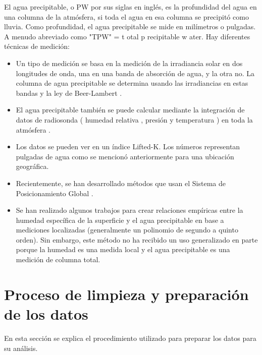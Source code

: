 \documentclass{article}
\begin{document}
El agua precipitable, o PW por sus siglas en inglés, es la profundidad del agua en una columna de la atmósfera, si toda el agua en esa columna se precipitó como lluvia. Como profundidad, el agua precipitable se mide en milímetros o pulgadas. A menudo abreviado como "TPW" = t otal p recipitable w ater. Hay diferentes técnicas de medición:
\begin{itemize}
\item Un tipo de medición se basa en la medición de la irradiancia solar en dos longitudes de onda, una en una banda de absorción de agua, y la otra no. La columna de agua precipitable se determina usando las irradiancias en estas bandas y la ley de Beer-Lambert .
\item El agua precipitable también se puede calcular mediante la integración de datos de radiosonda ( humedad relativa , presión y temperatura ) en toda la atmósfera .
\item Los datos se pueden ver en un índice Lifted-K. Los números representan pulgadas de agua como se mencionó anteriormente para una ubicación geográfica.
\item Recientemente, se han desarrollado métodos que usan el Sistema de Posicionamiento Global .
\item Se han realizado algunos trabajos para crear relaciones empíricas entre la humedad específica de la superficie y el agua precipitable en base a mediciones localizadas (generalmente un polinomio de segundo a quinto orden). Sin embargo, este método no ha recibido un uso generalizado en parte porque la humedad es una medida local y el agua precipitable es una medición de columna total.
\end{itemize}

\section{Proceso de limpieza y preparación de los datos}
En esta sección se explica el procedimiento utilizado para preparar los datos para su análisis.
\end{document}
